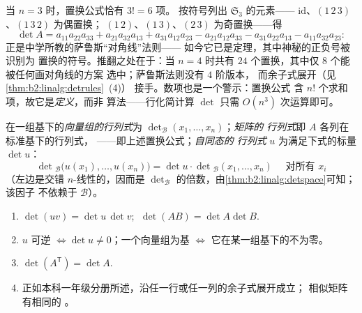 \begin{example}[萨鲁斯法则的推导与推翻]\label{ex:b2:linalg:sarrus}
当 $n = 3$ 时，置换公式恰有 $3! = 6$ 项。
按符号列出 $\mathfrak{S}_3$ 的元素——
$\mathrm{id}$、$(1\,2\,3)$、$(1\,3\,2)$ 为偶置换；
$(1\,2)$、$(1\,3)$、$(2\,3)$ 为奇置换——得
\[
\det A = a_{11}a_{22}a_{33} + a_{21}a_{32}a_{13} +
a_{31}a_{12}a_{23}
- a_{21}a_{12}a_{33} - a_{31}a_{22}a_{13} -
a_{11}a_{32}a_{23} :
\]
正是中学所教的萨鲁斯“对角线”法则——
如今它已是定理，其中神秘的正负号被识别为
置换的符号。推翻之处在于：当 $n = 4$ 时共有 $24$
个置换，其中仅 $8$ 个能被任何画对角线的方案
选中；萨鲁斯法则没有 $4$ 阶版本，
而余子式展开（见\cref{thm:b2:linalg:detrules}~(4)）
接手。数项也是一个警示：置换公式
含 $n!$ 个求和项，故它是\emph{定义}，而非
算法——行化简计算 $\det$ 只需
$O(n^3)$ 次运算即可。
\end{example}

\begin{definition}[行列式]\label{def:b2:linalg:det}
在一组基下的\emph{向量组的行列式}为
$\det_{\mathcal{B}}(x_1, \dots, x_n)$；\emph{矩阵的
行列式}即 $A$ 各列在标准基下的行列式，
——即上述置换公式；\emph{自同态的
行列式} $u$ 为满足下式的标量 $\det u$：
\[
\det{}_{\mathcal{B}}\bigl(u(x_1), \dots, u(x_n)\bigr)
= \det u \cdot \det{}_{\mathcal{B}}(x_1, \dots, x_n)
\quad \text{ 对所有 } x_i
\]
（左边是交错 $n$-线性的，因而是
$\det_\mathcal{B}$ 的倍数，由\cref{thm:b2:linalg:detspace}可知；该因子
不依赖于 $\mathcal{B}$）。
\end{definition}

\begin{theorem}[行列式的运算法则（已证）]\label{thm:b2:linalg:detrules}
\begin{enumerate}
  \item $\det(uv) = \det u\,\det v$; $\;\det(AB) = \det A \det B$.
  \item $u$ 可逆 $\iff \det u \neq 0$；一个向量组为基
        $\iff$ 它在某一组基下的不为零。
  \item $\det(A^{\mathsf T}) = \det A$.
  \item 正如本科一年级分册所述，沿任一行或任一列的余子式展开成立；
        相似矩阵有相同的
        。
\end{enumerate}
\end{theorem}

